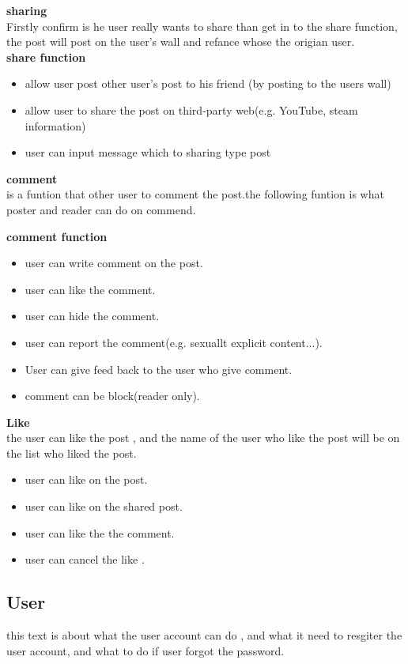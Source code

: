 \textbf{sharing}\\
Firstly confirm is he user really wants to share than get in to the share
function, the post will post on the user's wall and refance whose the origian
user.\\
\textbf{share function}
\begin{itemize}
\item allow user post other user's post to his friend (by posting to the users
      wall)
\item allow user to share the post on third-party web(e.g. YouTube, steam
      information)
\item user can input message which to sharing type post 
\end{itemize}

\textbf{comment}\\
is a funtion that other user to comment the post.the following funtion is what
poster and reader can do on commend.

\textbf{comment function}
\begin{itemize}
\item user can write comment on the post.
\item user can like the comment.
\item user can hide the comment.
\item user can report the comment(e.g. sexuallt explicit content...).
\item User can give feed back to the user who give comment.
\item comment can be block(reader only).
\end{itemize}

\textbf{Like}\\
the user can like the post , and the name of the user who like the post will be
on the list who liked the post.

\begin{itemize}
\item user can like on the post.
\item user can like on the shared post.
\item user can like the the comment.
\item user can cancel the like .
\end{itemize}

\subsection{User}
this text is about what the user account can do , and what it need to resgiter
the user account, and what to do if user forgot the password.

